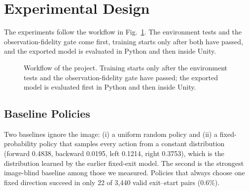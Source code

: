 \documentclass[conference]{IEEEtran}
\begin{document}
\section{Experimental Design}\label{sec:design}
The experiments follow the workflow in Fig.~\ref{fig:workflow}. The environment tests and the observation-fidelity gate come first, training starts only after both have passed, and the exported model is evaluated in Python and then inside Unity.

\begin{figure}[!t]
\centering
{}
\caption{Workflow of the project. Training starts only after the environment tests and the observation-fidelity gate have passed; the exported model is evaluated first in Python and then inside Unity.}
\label{fig:workflow}
\end{figure}


\subsection{Baseline Policies}
Two baselines ignore the image: (i) a uniform random policy and (ii) a fixed-probability policy that samples every action from a constant distribution (forward 0.4838, backward 0.0195, left 0.1214, right 0.3753), which is the distribution learned by the earlier fixed-exit model. The second is the strongest image-blind baseline among those we measured. Policies that always choose one fixed direction succeed in only 22 of 3,440 valid exit--start pairs (0.6\%).
\end{document}
